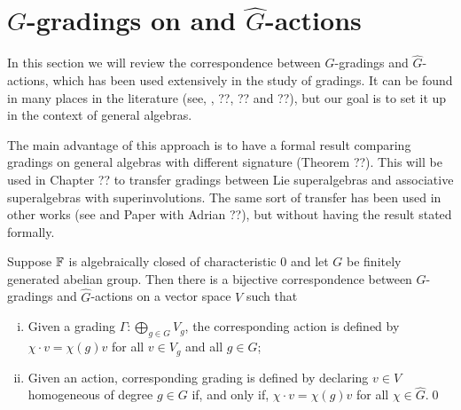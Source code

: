 
\section{$G$-gradings on  and $\widehat G$-actions}

In this section we will review the correspondence between $G$-gradings and $\widehat G$-actions, which has been used extensively in the study of gradings. 
It can be found in many places in the literature (see, \eg, ??, ?? and ??), but our goal is to set it up in the context of general algebras. 

The main advantage of this approach is to have a formal result comparing gradings on general algebras with different signature (Theorem ??). 
This will be used in Chapter ?? to transfer gradings between Lie superalgebras and associative superalgebras with superinvolutions. 
The same sort of transfer has been used in other works (see \cite{livromicha} and Paper with Adrian ??), but without having the result stated formally.


\begin{thm}
    Suppose $\mathbb{F}$ is algebraically closed of characteristic $0$ and let $G$ be finitely generated abelian group. 
    Then there is a bijective correspondence between $G$-gradings and $\widehat G$-actions on a vector space $V$ such that
    \begin{enumerate}[(i)]
        \item Given a grading $\Gamma: \bigoplus_{g\in G} V_g$, the corresponding action is defined by $\chi\cdot v = \chi(g) v$ for all $v\in V_g$ and all $g\in G$;
        \item Given an action, corresponding grading is defined by declaring $v\in V$ homogeneous of degree $g\in G$ if, and only if, $\chi\cdot v = \chi(g) v$ for all $\chi \in \widehat G$.\qed
    \end{enumerate}
\end{thm}

